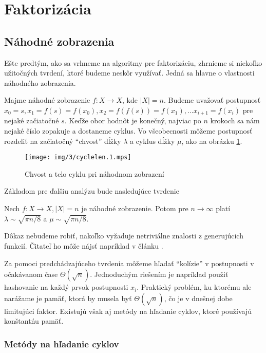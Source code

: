 \section{Faktorizácia}

\subsection{Náhodné zobrazenia}
Ešte predtým, ako sa vrhneme na algoritmy pre faktorizáciu, zhrnieme
si niekoľko užitočných tvrdení, ktoré budeme neskôr využívať. Jedná sa
hlavne o vlastnosti náhodného zobrazenia.

Majme náhodné zobrazenie $f:X \rightarrow X$, kde $|X| = n$.
Budeme uvažovať postupnosť $x_0 = s, x_1=f(s)=f(x_0), x_2 =
f(f(s))=f(x_1), \dots x_{i+1} = f(x_{i})$ pre nejaké začiatočné $s$.
Keďže obor hodnôt je konečný, najviac po $n$ krokoch sa nám nejaké
číslo zopakuje a dostaneme cyklus. Vo všeobecnosti môžeme postupnosť
rozdeliť na začiatočný ``chvost'' dĺžky $\lambda$ a cyklus dĺžky
$\mu$, ako na obrázku \ref{fig:cyclelen}.

\begin{figure}[h!]
    \caption{Chvost a telo cyklu pri náhodnom zobrazení}
    \label{fig:cyclelen}
    \centering
    \texttt{[image: img/3/cyclelen.1.mps]}
\end{figure}

Základom pre ďalšiu analýzu bude nasledujúce tvrdenie
\begin{lema}
    Nech $f:X\rightarrow X, |X|=n$ je náhodné zobrazenie.
    Potom pre $n\rightarrow \infty$ platí
    $\lambda \sim \sqrt{\pi n/8}$ a 
    $\mu \sim \sqrt{\pi n/8}$.
\end{lema}
\begin{dokaz}
    Dôkaz nebudeme robiť, nakoľko vyžaduje netriviálne znalosti
    z generujúcich funkcií. Čitateľ ho môže nájsť napríklad v článku
    \cite{randommap}.
\end{dokaz}

Za pomoci predchádzajúceho tvrdenia môžeme hľadať ``kolízie'' v
postupnosti v očakávanom čase $\Theta(\sqrt{n})$.
Jednoduchým riešením je napríklad použiť hashovanie na každý prvok
postupnosti $x_i$. Praktický problém, ku ktorému ale narážame je
pamäť, ktorá by musela byť $\Theta(\sqrt{n})$, čo je v dnešnej dobe
limitujúci faktor. Existujú však aj metódy na hľadanie cyklov,
ktoré používajú konštantńu pamäť.

\subsubsection{Metódy na hľadanie cyklov}

